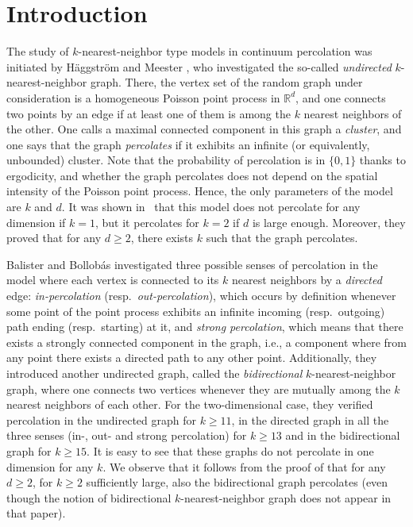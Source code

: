 \documentclass[oneside]{amsart}
\theoremstyle{definition}
\newcommand{\1}{\mathbbm{1}}
\newcommand{\0}{\mathbf{o}}
\newcommand{\R}{\mathbb{R}}
\numberwithin{equation}{section}
\begin{document}
\section{Introduction}
The study of $k$-nearest-neighbor type models in continuum percolation was initiated by Häggström and Meester \cite{HaggMee96}, who investigated the so-called \emph{undirected} $k$-nearest-neighbor graph. There, the vertex set of the random graph under consideration is a homogeneous Poisson point process in $\R^d$, and one connects two points by an edge if at least one of them is among the $k$ nearest neighbors of the other. One calls a maximal connected component in this graph a \emph{cluster}, and one says that the graph \emph{percolates} if it exhibits an infinite (or equivalently, unbounded) cluster. Note that the probability of percolation is in $\{0,1\}$ thanks to ergodicity, and whether the graph percolates does not depend on the spatial intensity of the Poisson point process. Hence, the only parameters of the model are $k$ and $d$. It was shown in~\cite{HaggMee96} that this model does not percolate for any dimension if $k = 1$, but it percolates for $k=2$ if $d$ is large enough. Moreover, they proved that for any $d \geq 2$, there exists $k$ such that the graph percolates.

Balister and Bollobás \cite{BalisterBollobas13} investigated three possible senses of percolation in the model where each vertex is connected  to its $k$ nearest neighbors by a \emph{directed} edge: \emph{in-percolation} (resp.~\emph{out-percolation}), which occurs by definition whenever some point of the point process exhibits an infinite incoming (resp.\ outgoing) path ending (resp.\ starting) at it, and \emph{strong percolation}, which means that there exists a strongly connected component in the graph, i.e., a component where from any point there exists a directed path to any other point. Additionally, they introduced another undirected graph, called the \emph{bidirectional} $k$-nearest-neighbor graph, where one connects two vertices whenever they are mutually among the $k$ nearest neighbors of each other. For the two-dimensional case, they verified percolation in the undirected graph for $k \geq 11$, in the directed graph in all the three senses (in-, out- and strong percolation) for $k \geq 13$ and in the bidirectional graph for $k \geq 15$. It is easy to see that these graphs do not percolate in one dimension for any $k$. We observe that it follows from the proof of \cite[Theorem 2.2]{HaggMee96} that for any $d\geq 2$, for $k \geq 2$ sufficiently large, also the bidirectional graph percolates (even though the notion of bidirectional $k$-nearest-neighbor graph does not appear in that paper).
\end{document}
